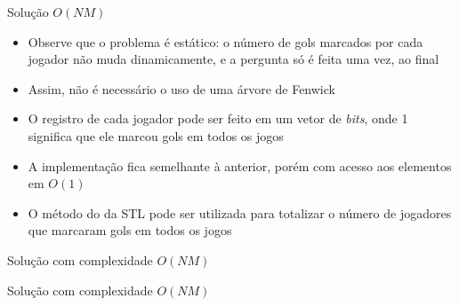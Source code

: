 \begin{frame}[fragile]{Solução $O(NM)$}

    \begin{itemize}
        \item Observe que o problema é estático: o número de gols marcados por cada jogador
            não muda dinamicamente, e a pergunta só é feita uma vez, ao final
            
        \item Assim, não é necessário o uso de uma árvore de Fenwick

        \item O registro de cada jogador pode ser feito em um vetor de \textit{bits}, onde
            1 significa que ele marcou gols em todos os jogos

        \item A implementação fica semelhante à anterior, porém com acesso aos elementos em
            $O(1)$

        \item O método  do  da STL pode ser utilizada para
            totalizar o número de jogadores que marcaram gols em todos os jogos
    \end{itemize}

\end{frame}

\begin{frame}[fragile]{Solução com complexidade $O(NM)$}
\end{frame}

\begin{frame}[fragile]{Solução com complexidade $O(NM)$}
\end{frame}
